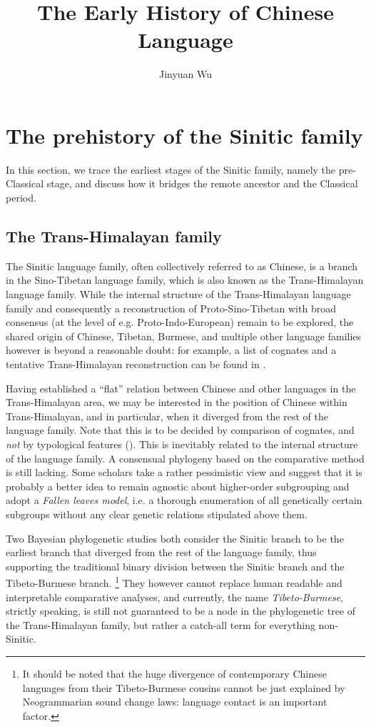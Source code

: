 \documentclass[UTF8, a4paper, oneside, scheme=plain, 12pt]{ctexrep}
\title{The Early History of Chinese Language}
\author{Jinyuan Wu}
\newcommand*{\term}[1]{\emph{#1}}
\begin{document}
\maketitle


\chapter{The prehistory of the Sinitic family}


In this section, we trace the earliest stages of the Sinitic family,
namely the pre-Classical stage, and discuss how it bridges the remote ancestor
and the Classical period.

\section{The Trans-Himalayan family}

The Sinitic language family, often collectively referred to as Chinese,
is a branch in the Sino-Tibetan language family, which is also known as the Trans-Himalayan language family.
While the internal structure of the Trans-Himalayan language family
and consequently a reconstruction of Proto-Sino-Tibetan with broad consensus
(at the level of e.g. Proto-Indo-European) remain to be explored,
the shared origin of Chinese, Tibetan, Burmese, and multiple other language families
however is beyond a reasonable doubt:
for example, a list of cognates and a tentative Trans-Himalayan reconstruction can be found in \citet{hill2019historical}.

Having established a ``flat'' relation between Chinese and other languages in the Trans-Himalayan area, 
we may be interested in the position of Chinese within Trans-Himalayan,
and in particular, when it diverged from the rest of the language family.
Note that this is to be decided by comparison of cognates,
and \emph{not} by typological features ().
This is inevitably related to the internal structure of the language family.
A consensual phylogeny based on the comparative method is still lacking.
Some scholars take a rather pessimistic view and suggest that
it is probably a better idea to remain agnostic about higher-order subgrouping
and adopt a \emph{Fallen leaves model}, i.e. a thorough enumeration of all genetically certain subgroups without any clear genetic relations stipulated above them.

Two Bayesian phylogenetic studies \citep{sagart2019dated,zhang2019phylogenetic} 
both consider the Sinitic branch to be the earliest branch that diverged from the rest of the language family,
thus supporting the traditional binary division between the Sinitic branch
and the Tibeto-Burmese branch.%
\footnote{
    It should be noted that the huge divergence of contemporary Chinese languages
    from their Tibeto-Burmese cousins 
    cannot be just explained by Neogrammarian sound change laws:
    language contact is an important factor.
}
They however cannot replace human readable and interpretable comparative analyses,
and currently, the name \term{Tibeto-Burmese}, strictly speaking,
is still not guaranteed to be a node in the phylogenetic tree of the Trans-Himalayan family,
but rather a catch-all term for everything non-Sinitic.
\end{document}
